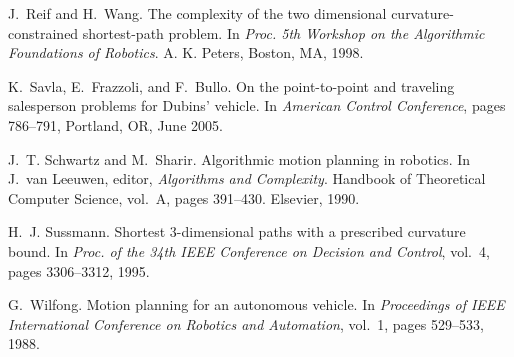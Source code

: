 \documentclass[a4paper]{article}
\begin{document}
\begin{thebibliography}{10}
J.~Reif and H.~Wang.
\newblock The complexity of the two dimensional curvature-constrained
  shortest-path problem.
\newblock In {\em Proc. 5th Workshop on the Algorithmic Foundations of
  Robotics}. A. K. Peters, Boston, MA, 1998.

K.~Savla, E.~Frazzoli, and F.~Bullo.
\newblock On the point-to-point and traveling salesperson problems for
  {D}ubins' vehicle.
\newblock In {\em American Control Conference}, pages 786--791, Portland, OR,
  June 2005.

J.~T. Schwartz and M.~Sharir.
\newblock Algorithmic motion planning in robotics.
\newblock In J.~van Leeuwen, editor, {\em Algorithms and Complexity}. Handbook
  of Theoretical Computer Science, vol.~A, pages 391--430. Elsevier, 1990.

H.~J. Sussmann.
\newblock Shortest 3-dimensional paths with a prescribed curvature bound.
\newblock In {\em Proc. of the 34th IEEE Conference on Decision and Control},
  vol.~4, pages 3306--3312, 1995.

G.~Wilfong.
\newblock Motion planning for an autonomous vehicle.
\newblock In {\em Proceedings of IEEE International Conference on Robotics and
  Automation}, vol.~1, pages 529--533, 1988.

\end{thebibliography}
\end{document}
